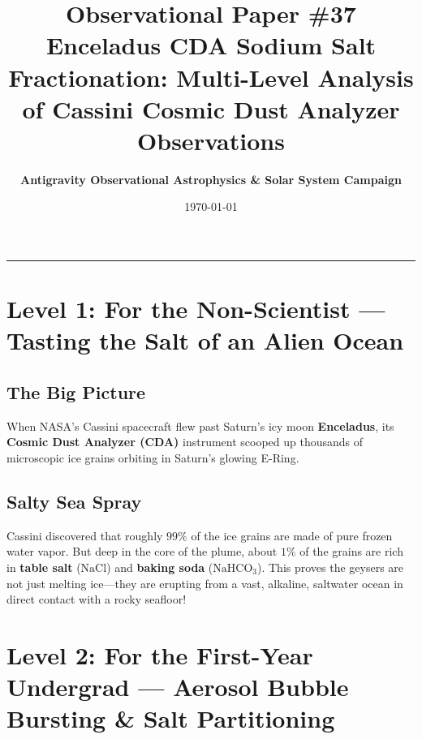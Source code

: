 \documentclass[11pt,a4paper]{article}
\title{\Huge \textbf{Observational Paper \#37}\\ \Large Enceladus CDA Sodium Salt Fractionation: Multi-Level Analysis of Cassini Cosmic Dust Analyzer Observations}
\author{\textbf{Antigravity Observational Astrophysics \& Solar System Campaign}}
\date{\today}
\begin{document}
\maketitle

\vspace{-1em}
\begin{center}
\rule{\textwidth}{1.5pt}
\end{center}

\section*{Level 1: For the Non-Scientist — Tasting the Salt of an Alien Ocean}

\subsection*{The Big Picture}
When NASA's Cassini spacecraft flew past Saturn's icy moon \textbf{Enceladus}, its \textbf{Cosmic Dust Analyzer (CDA)} instrument scooped up thousands of microscopic ice grains orbiting in Saturn's glowing E-Ring. 

\subsection*{Salty Sea Spray}
Cassini discovered that roughly $99\%$ of the ice grains are made of pure frozen water vapor. But deep in the core of the plume, about $1\%$ of the grains are rich in \textbf{table salt} ($\mathrm{NaCl}$) and \textbf{baking soda} ($\mathrm{NaHCO_3}$). This proves the geysers are not just melting ice—they are erupting from a vast, alkaline, saltwater ocean in direct contact with a rocky seafloor!

\newpage

\section*{Level 2: For the First-Year Undergrad — Aerosol Bubble Bursting \& Salt Partitioning}
\end{document}
